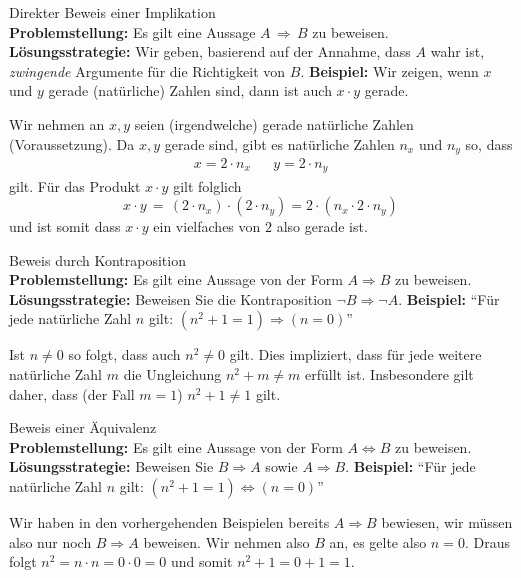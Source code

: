 \begin{KR}{Direkter Beweis einer Implikation}\\
    \textbf{Problemstellung:} Es gilt eine Aussage $A\,\Rightarrow \, B$ zu beweisen.\\
    \textbf{Lösungsstrategie:} Wir geben, basierend auf der Annahme, dass $A$ wahr ist, \textit{zwingende} Argumente für die Richtigkeit von $B$.
    \tcblower
    \textbf{Beispiel:} Wir zeigen, wenn $x$ und $y$ gerade (natürliche) Zahlen sind, dann ist auch $x\cdot y$ gerade.

    Wir nehmen an $x,y$ seien (irgendwelche) gerade natürliche Zahlen (Voraussetzung). Da $x,y$ gerade sind, gibt es natürliche Zahlen $n_x$ und $n_y$ so, dass
    \begin{align*}
        x=2\cdot n_x&&y=2\cdot n_y
    \end{align*}
    gilt. Für das Produkt $x\cdot y$ gilt folglich
    $$
        x\cdot y \,=\, (2\cdot n_x)\cdot(2\cdot n_y)=2\cdot(n_x\cdot 2\cdot n_y)
    $$
    und ist somit dass $x\cdot y$ ein vielfaches von $2$ also gerade ist.
\end{KR}

\begin{KR}{Beweis durch Kontraposition}\\
    \textbf{Problemstellung:} Es gilt eine Aussage von der Form $A\Rightarrow B$ zu beweisen.\\
    \textbf{Lösungsstrategie:} Beweisen Sie die Kontraposition $\neg B\Rightarrow\neg A$.
    \tcblower
    \textbf{Beispiel:} ``Für jede natürliche Zahl $n$ gilt: $(n^2+1=1)\Rightarrow (n=0)$''

    Ist $n\neq 0$ so folgt, dass auch $n^2\neq 0$ gilt. Dies impliziert, dass für jede weitere natürliche Zahl $m$ die Ungleichung $n^2+m\neq m$ erfüllt ist. Insbesondere gilt daher, dass (der Fall $m=1$) $n^2+1\neq 1$ gilt.
\end{KR}

\begin{KR}{Beweis einer Äquivalenz}\\
    \textbf{Problemstellung:} Es gilt eine Aussage von der Form $A\Leftrightarrow B$ zu beweisen.\\
    \textbf{Lösungsstrategie:} Beweisen Sie $B\Rightarrow A$ sowie $A\Rightarrow B$.
    \tcblower
    \textbf{Beispiel:} ``Für jede natürliche Zahl $n$ gilt: $(n^2+1=1)\Leftrightarrow (n=0)$''

    Wir haben in den vorhergehenden Beispielen bereits $A\Rightarrow B$ bewiesen, wir müssen also nur noch $B\Rightarrow A$ beweisen. Wir nehmen also $B$ an, es gelte also $n=0$. Draus folgt $n^2=n\cdot n=0\cdot 0=0$ und somit $n^2+1=0+1=1$.
\end{KR}

